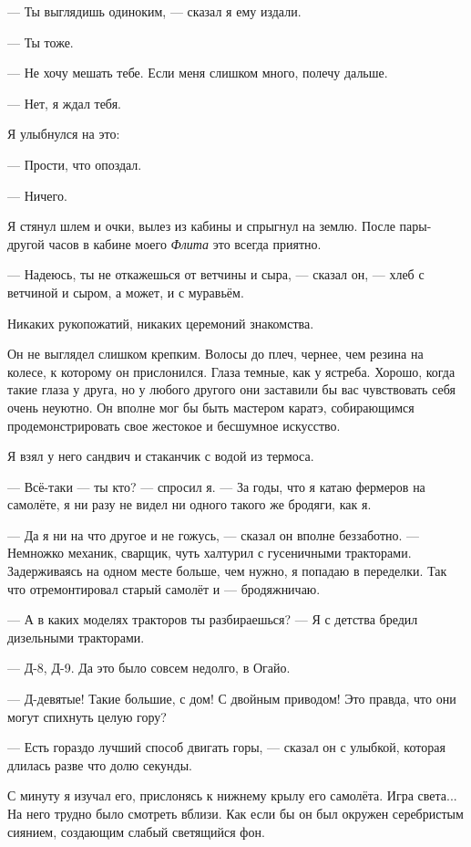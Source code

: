 --- Ты выглядишь одиноким, --- сказал я ему издали.

--- Ты тоже.

--- Не хочу мешать тебе. Если меня слишком много, полечу дальше.

--- Нет, я ждал тебя.

Я улыбнулся на это:

--- Прости, что опоздал.

--- Ничего.

Я стянул шлем и очки, вылез из кабины и спрыгнул на землю. После пары-другой часов в кабине моего
{\it Флита\/} это всегда приятно.

--- Надеюсь, ты не откажешься от ветчины и сыра, --- сказал он, --- хлеб с ветчиной и сыром, а может, и с муравьём.

Никаких рукопожатий, никаких церемоний знакомства.

Он не выглядел слишком крепким. Волосы до плеч, чернее, чем резина на колесе, к которому он прислонился. Глаза темные, как у ястреба. Хорошо, когда такие глаза у друга, но у любого другого они заставили бы вас чувствовать себя очень неуютно. Он вполне мог бы быть мастером каратэ, собирающимся продемонстрировать свое жестокое и бесшумное искусство.

Я взял у него сандвич и стаканчик с водой из термоса.

--- Всё-таки --- ты кто? --- спросил я. --- За годы, что я катаю фермеров на самолёте, я ни разу не видел ни одного такого же бродяги, как я.

--- Да я ни на что другое и не гожусь, --- сказал он вполне беззаботно. --- Немножко механик, сварщик, чуть халтурил с гусеничными тракторами. Задерживаясь на одном месте больше, чем нужно, я попадаю в переделки. Так что отремонтировал старый самолёт и --- бродяжничаю.

--- А в каких моделях тракторов ты разбираешься? --- Я с детства бредил дизельными тракторами.

--- Д-8, Д-9. Да это было совсем недолго, в Огайо.

--- Д-девятые! Такие большие, с дом! С двойным приводом! Это правда, что они могут спихнуть целую гору?

--- Есть гораздо лучший способ двигать горы, --- сказал он с улыбкой, которая длилась разве что долю секунды.

С минуту я изучал его, прислонясь к нижнему крылу его самолёта. Игра света... На него трудно было смотреть вблизи. Как если бы он был окружен серебристым сиянием, создающим слабый светящийся фон.

